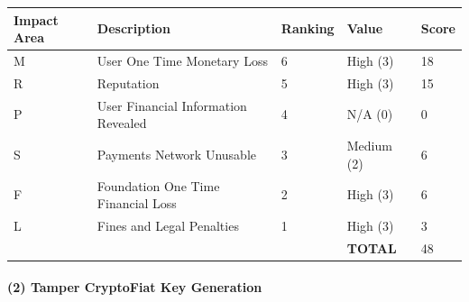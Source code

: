 \documentclass[a4paper,12pt]{article} %
\begin{document}
{\begin{center}
\begin{tabular}{ | l | l | l | l | l |}
  \hline
  \textbf{Impact Area} & \textbf{Description} & \textbf{Ranking} & \textbf{Value} & \textbf{Score}
  \\ \hline
  M & User One Time Monetary Loss			& 6	& High (3)		& 18
  \\ \hline
  R & Reputation		& 5	& High (3)		& 15
  \\ \hline
  P & User Financial Information Revealed		& 4	& N/A (0)		& 0
  \\ \hline
  S & Payments Network Unusable					& 3	& Medium (2)	& 6
  \\ \hline
  F & Foundation One Time Financial Loss	& 2	& High (3)		& 6
  \\ \hline
  L & Fines and Legal Penalties						& 1	& High (3)		& 3
  \\ \hline
  & & & \textbf{TOTAL} & 48
  \\ \hline
\end{tabular}
\end{center}
\label{tab:severityStealAdminKeyFromOnlineServer}

\paragraph{(2) Tamper CryptoFiat Key Generation }

}
\end{document}
